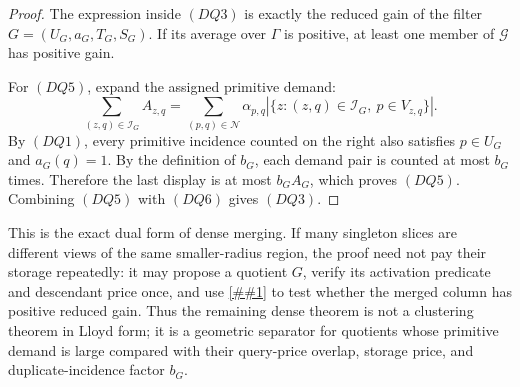 \documentclass[10pt]{article}
\newcommand{\cref}[1]{\ref{##1}}
\theoremstyle{definition}
\begin{document}
\begin{proof}
   The expression inside \((DQ3)\) is exactly the reduced gain of the filter
   \(G=(U_G,a_G,T_G,S_G)\).  If its average over \(\Gamma\) is positive, at least
   one member of \(\mathcal G\) has positive gain.

   For \((DQ5)\), expand the assigned primitive demand:
   \[
      \sum_{(z,q)\in\mathcal I_G}A_{z,q}
      =
      \sum_{(p,q)\in\mathcal N}
      \alpha_{p,q}
      \left|
         \{z:(z,q)\in\mathcal I_G,\ p\in V_{z,q}\}
      \right|.
   \]
   By \((DQ1)\), every primitive incidence counted on the right also satisfies
   \(p\in U_G\) and \(a_G(q)=1\).  By the definition of \(b_G\), each demand pair
   is counted at most \(b_G\) times.  Therefore the last display is at most
   \(b_GA_G\), which proves \((DQ5)\).  Combining \((DQ5)\) with \((DQ6)\) gives
   \((DQ3)\).
\end{proof}

This is the exact dual form of dense merging.  If many singleton slices are
different views of the same smaller-radius region, the proof need not pay their
storage repeatedly: it may propose a quotient \(G\), verify its activation
predicate and descendant price once, and use \cref{lem:dense-slice-quotient-separation}
to test whether the merged column has positive reduced gain.  Thus the remaining
dense theorem is not a clustering theorem in Lloyd form; it is a geometric
separator for quotients whose primitive demand is large compared with their
query-price overlap, storage price, and duplicate-incidence factor \(b_G\).
\end{document}
